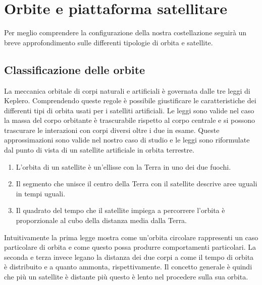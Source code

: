 \documentclass[12pt,a4paper,oneside]{book}
\begin{document}
		\section{Orbite e piattaforma satellitare}
		Per meglio comprendere la configurazione della nostra costellazione seguirà un breve approfondimento sulle differenti tipologie di orbita e satellite. 

			\subsection{Classificazione delle orbite}
			La meccanica orbitale di corpi naturali e artificiali è governata dalle tre leggi di Keplero. Comprendendo queste regole è possibile giustificare le caratteristiche dei differenti tipi di orbita usati per i satelliti artificiali. Le leggi sono valide nel caso la massa del corpo orbitante è trascurabile rispetto al corpo centrale e si possono trascurare le interazioni con corpi diversi oltre i due in esame. Queste approssimazioni sono valide nel nostro caso di studio e le leggi sono riformulate dal punto di vista di un satellite artificiale in orbita terrestre.
			\begin{enumerate}
				\item L'orbita di un satellite è un'ellisse con la Terra in uno dei due fuochi.
				\item Il segmento che unisce il centro della Terra con il satellite descrive aree uguali in tempi uguali.
				\item Il quadrato del tempo che il satellite impiega a percorrere l'orbita è proporzionale al cubo della distanza media dalla Terra.
			\end{enumerate}
			
			Intuitivamente la prima legge mostra come un'orbita circolare rappresenti un caso particolare di orbita e  come questo possa produrre comportamenti particolari. La seconda e terza invece legano la distanza dei due corpi a come il tempo di orbita è distribuito e a quanto ammonta, rispettivamente. Il concetto generale è quindi che più un satellite è distante più questo è lento nel procedere sulla sua orbita.
			
\end{document}

